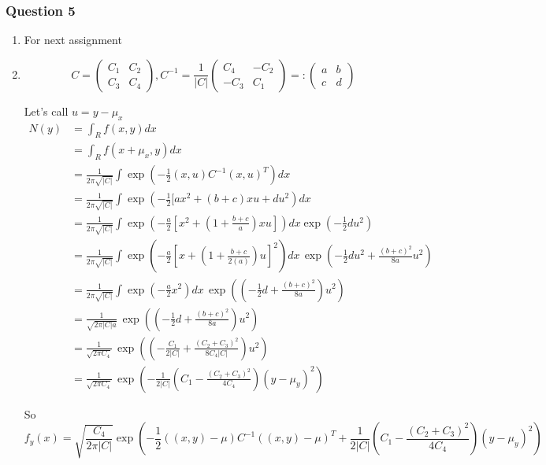 \documentclass[12pt]{article}
\newcommand{\Q}[1]{\subsubsection*{Question #1}}
\begin{document}
\Q{5}
\begin{enumerate}
\item For next assignment

\item
\[
C 
= 
\left(\begin{array}{cc}C_1& C_2\\ C_3& C_4\end{array}\right)
, C^{-1} = \frac{1}{|C|} \left(\begin{array}{cc}C_4& -C_2\\ -C_3& C_1\end{array}\right) =: \left(\begin{array}{cc}a & b\\ c & d\end{array}\right) 
\]




Let's call $u = y - \mu_x$ 
\begin{align}
N(y) &= \int_R f(x, y) dx 
\\&= \int_R f(x+\mu_x, y) dx 
\\&= \frac{1}{2\pi \sqrt{|C|}} \int  \exp( -\frac 1 2 (x,u)C^{-1}(x,u)^T ) dx
\\&= \frac{1}{2\pi \sqrt{|C|}} \int  \exp(-\frac 1 2 [a x^2 + (b+c)xu + d u^2 ) dx
\\&= \frac{1}{2\pi \sqrt{|C|}} \int  \exp(-\frac {a} 2 [x^2 + (1 + \frac{b+c}{a}) xu] ) dx  \exp(- \frac1 2 d u^2 )
\\&= \frac{1}{2\pi \sqrt{|C|}} \int  \exp\left(-\frac {a} 2 [x + (1 + \frac{b+c}{2(a)})u]^2 \right) dx \, \exp(- \frac1 2 d u^2 + \frac{(b+c)^2}{8a}u^2)
\\&= \frac{1}{2\pi \sqrt{|C|}} \int  \exp\left(-\frac {a} 2 x^2 \right) dx \, \exp( (-\frac1 2 d  + \frac{(b+c)^2}{8a}) u^2)
\\&= \frac{1}{\sqrt{2\pi |C| a}}  \, \exp( (-\frac1 2 d  + \frac{(b+c)^2}{8a}) u^2)
\\&= \frac{1}{\sqrt{2\pi C_4}}  \, \exp( (-\frac {C_1}{2|C|}  + \frac{(C_2+C_3)^2}{8C_4|C|}) u^2)
\\&= \frac{1}{\sqrt{2\pi C_4}}  \, \exp( -\frac1 {2|C|}(C_1  - \frac{(C_2+C_3)^2}{4C_4}) (y-\mu_y)^2)
\end{align}

So
$$f_y(x) = \sqrt{\frac{C_4}{2\pi |C|}} \exp( -\frac 1 2 ((x,y)-\mu)C^{-1}((x,y)-\mu)^T + \frac1 {2|C|}(C_1  - \frac{(C_2+C_3)^2}{4C_4}) (y-\mu_y)^2 ) $$

\end{enumerate}
\end{document}

